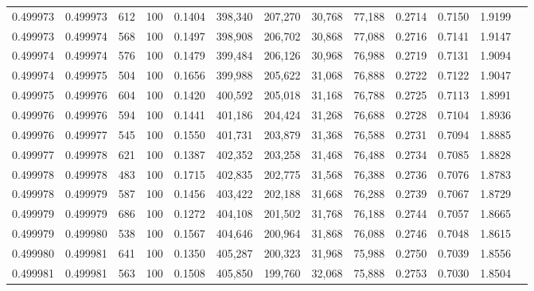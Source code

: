 \begin{tabular}{rrrrrrrrrrrrr}
0.499973 & 0.499973 &   612 & 100 &                                     0.1404 & 398,340 & 207,270 &  30,768 &  77,188 & 0.2714 & 0.7150 & 1.9199 \\
0.499973 & 0.499974 &   568 & 100 &                                     0.1497 & 398,908 & 206,702 &  30,868 &  77,088 & 0.2716 & 0.7141 & 1.9147 \\
0.499974 & 0.499974 &   576 & 100 &                                     0.1479 & 399,484 & 206,126 &  30,968 &  76,988 & 0.2719 & 0.7131 & 1.9094 \\
0.499974 & 0.499975 &   504 & 100 &                                     0.1656 & 399,988 & 205,622 &  31,068 &  76,888 & 0.2722 & 0.7122 & 1.9047 \\
0.499975 & 0.499976 &   604 & 100 &                                     0.1420 & 400,592 & 205,018 &  31,168 &  76,788 & 0.2725 & 0.7113 & 1.8991 \\
0.499976 & 0.499976 &   594 & 100 &                                     0.1441 & 401,186 & 204,424 &  31,268 &  76,688 & 0.2728 & 0.7104 & 1.8936 \\
0.499976 & 0.499977 &   545 & 100 &                                     0.1550 & 401,731 & 203,879 &  31,368 &  76,588 & 0.2731 & 0.7094 & 1.8885 \\
0.499977 & 0.499978 &   621 & 100 &                                     0.1387 & 402,352 & 203,258 &  31,468 &  76,488 & 0.2734 & 0.7085 & 1.8828 \\
0.499978 & 0.499978 &   483 & 100 &                                     0.1715 & 402,835 & 202,775 &  31,568 &  76,388 & 0.2736 & 0.7076 & 1.8783 \\
0.499978 & 0.499979 &   587 & 100 &                                     0.1456 & 403,422 & 202,188 &  31,668 &  76,288 & 0.2739 & 0.7067 & 1.8729 \\
0.499979 & 0.499979 &   686 & 100 &                                     0.1272 & 404,108 & 201,502 &  31,768 &  76,188 & 0.2744 & 0.7057 & 1.8665 \\
0.499979 & 0.499980 &   538 & 100 &                                     0.1567 & 404,646 & 200,964 &  31,868 &  76,088 & 0.2746 & 0.7048 & 1.8615 \\
0.499980 & 0.499981 &   641 & 100 &                                     0.1350 & 405,287 & 200,323 &  31,968 &  75,988 & 0.2750 & 0.7039 & 1.8556 \\
0.499981 & 0.499981 &   563 & 100 &                                     0.1508 & 405,850 & 199,760 &  32,068 &  75,888 & 0.2753 & 0.7030 & 1.8504 \\

\end{tabular}

